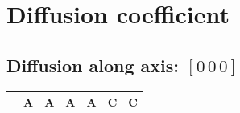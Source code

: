 \documentclass[a4paper, 11pt]{article}
\begin{document}
\section{Diffusion coefficient }
\footnotesize


\subsection{Diffusion along axis: $\left[		0 		\, 0 		\, 0 \right]$}

\clearpage
\begin{landscape}

\footnotesize
\renewcommand{\arraystretch}{1.8}
\begin{table}[htpb]
	\begin{tabularx}{\linewidth}{ p{15pt} | >{\raggedright\arraybackslash}X  >{\raggedright\arraybackslash}X  >{\raggedright\arraybackslash}X  >{\raggedright\arraybackslash}X  >{\raggedright\arraybackslash}X  >{\raggedright\arraybackslash}X }
		\toprule
   &  A &  A &  A &  A &  C &  C\\ \midrule


\end{tabularx}
\end{table}
\end{landscape}
\end{document}

